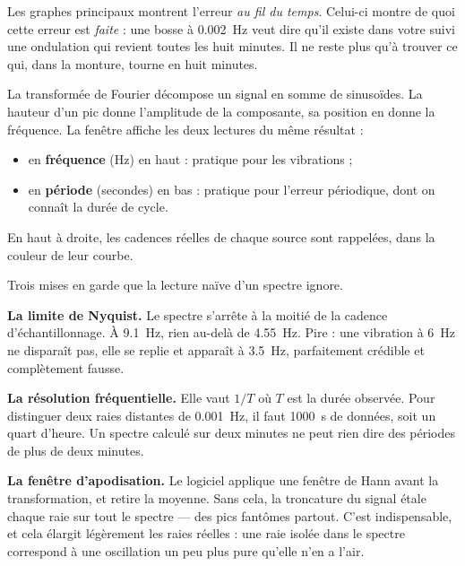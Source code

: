 \documentclass[a4paper,11pt,twoside]{report}
\begin{document}
\begin{simple}
Les graphes principaux montrent l'erreur \emph{au fil du temps}. Celui-ci
montre de quoi cette erreur est \emph{faite} : une bosse à
\SI{0,002}{\hertz} veut dire qu'il existe dans votre suivi une ondulation qui
revient toutes les huit minutes. Il ne reste plus qu'à trouver ce qui, dans
la monture, tourne en huit minutes.
\end{simple}

\begin{prepa}
La transformée de Fourier décompose un signal en somme de sinusoïdes. La
hauteur d'un pic donne l'amplitude de la composante, sa position en donne la
fréquence. La fenêtre affiche les deux lectures du même résultat :
\begin{itemize}[nosep]
  \item en \textbf{fréquence} (Hz) en haut : pratique pour les vibrations ;
  \item en \textbf{période} (secondes) en bas : pratique pour l'erreur
  périodique, dont on connaît la durée de cycle.
\end{itemize}
En haut à droite, les cadences réelles de chaque source sont rappelées, dans
la couleur de leur courbe.
\end{prepa}

\begin{avance}
Trois mises en garde que la lecture naïve d'un spectre ignore.

\medskip
\textbf{La limite de Nyquist.} Le spectre s'arrête à la moitié de la cadence
d'échantillonnage. À \SI{9,1}{\hertz}, rien au-delà de \SI{4,55}{\hertz}.
Pire : une vibration à \SI{6}{\hertz} ne disparaît pas, elle se replie et
apparaît à \SI{3,5}{\hertz}, parfaitement crédible et complètement fausse.

\medskip
\textbf{La résolution fréquentielle.} Elle vaut $1/T$ où $T$ est la durée
observée. Pour distinguer deux raies distantes de \SI{0,001}{\hertz}, il faut
\SI{1000}{\second} de données, soit un quart d'heure. Un spectre calculé sur
deux minutes ne peut rien dire des périodes de plus de deux minutes.

\medskip
\textbf{La fenêtre d'apodisation.} Le logiciel applique une fenêtre de Hann
avant la transformation, et retire la moyenne. Sans cela, la troncature du
signal étale chaque raie sur tout le spectre --- des pics fantômes partout.
C'est indispensable, et cela élargit légèrement les raies réelles : une raie
isolée dans le spectre correspond à une oscillation un peu plus pure qu'elle
n'en a l'air.
\end{avance}
\end{document}
